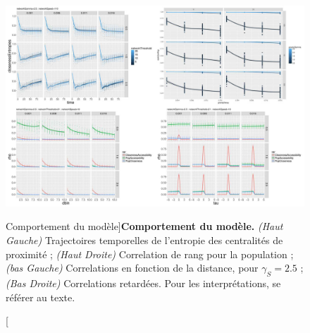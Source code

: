 \begin{figure}
	\includegraphics{Figures/Final/6-1-3-fig-macrocoevolexplo-behavior.jpg}
	\caption[Model Behavior][Comportement du modèle]{}{\textbf{Comportement du modèle.} \textit{(Haut Gauche)} Trajectoires temporelles de l'entropie des centralités de proximité ; \textit{(Haut Droite)} Correlation de rang pour la population ; \textit{(bas Gauche)} Correlations en fonction de la distance, pour $\gamma_S = 2.5$ ; \textit{(Bas Droite)} Correlations retardées. Pour les interprétations, se référer au texte.\label{fig:macrocoevolexplo:behavior}}
\end{figure}











\stars

















